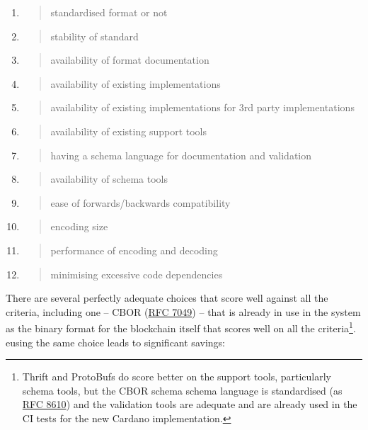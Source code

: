 \documentclass[11pt,a4paper]{article}
\begin{document}
\begin{enumerate}
\def\labelenumi{\arabic{enumi}.}
\item
  \begin{quote}
  standardised format or not
  \end{quote}
\item
  \begin{quote}
  stability of standard
  \end{quote}
\item
  \begin{quote}
  availability of format documentation
  \end{quote}
\item
  \begin{quote}
  availability of existing implementations
  \end{quote}
\item
  \begin{quote}
  availability of existing implementations for 3rd party implementations
  \end{quote}
\item
  \begin{quote}
  availability of existing support tools
  \end{quote}
\item
  \begin{quote}
  having a schema language for documentation and validation
  \end{quote}
\item
  \begin{quote}
  availability of schema tools
  \end{quote}
\item
  \begin{quote}
  ease of forwards/backwards compatibility
  \end{quote}
\item
  \begin{quote}
  encoding size
  \end{quote}
\item
  \begin{quote}
  performance of encoding and decoding
  \end{quote}
\item
  \begin{quote}
  minimising excessive code dependencies
  \end{quote}
\end{enumerate}

There are several perfectly adequate choices that score well against all
the criteria, including one -- CBOR
(\href{https://tools.ietf.org/html/rfc7049}{{RFC 7049}}) -- that is
already in use in the system as the binary format for the blockchain
itself that scores well on all the criteria\footnote{Thrift and
  ProtoBufs do score better on the support tools, particularly schema
  tools, but the CBOR schema schema language is standardised (as
  \href{https://tools.ietf.org/html/rfc8610}{{RFC 8610}}) and the
  validation tools are adequate and are already used in the CI tests for
  the new Cardano implementation.}. eusing the same choice leads to
significant savings:
\end{document}
